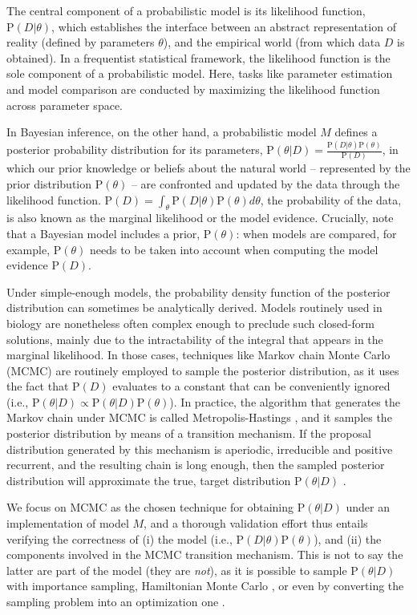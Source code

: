 \documentclass[oneside]{article}
\begin{document}
The central component of a probabilistic model is its likelihood
function, $\text{P}(D|\theta)$, which establishes the
interface between an abstract representation of reality (defined by parameters $\theta$), and the
empirical world (from which data $D$ is obtained).
In a frequentist statistical framework, the likelihood function is the sole
component of a probabilistic model.
Here, tasks like parameter estimation and model comparison are conducted
by maximizing the likelihood function across parameter
space.

In Bayesian inference, on the other hand, a probabilistic model $M$
defines a posterior probability distribution for its parameters,
$\text{P}(\theta|D) = \frac{\text{P}(D|\theta)\text{P}(\theta)}{\text{P}(D)}$, in which our prior
knowledge or beliefs about the natural world -- represented by the prior
distribution $\text{P}(\theta)$ -- are confronted and updated by the data through the
likelihood function.
$\text{P}(D) = \int_\theta \text{P}(D|\theta)\text{P}(\theta)d\theta$, the probability of
the data, is also known as the marginal likelihood or the model
evidence.
Crucially, note that a Bayesian model includes a prior, $\text{P}(\theta)$:
when models are compared, for example, $\text{P}(\theta)$ needs to be taken
into account when computing the model evidence $\text{P}(D)$.

Under simple-enough models, the probability density function of the posterior distribution can sometimes be analytically
derived.
Models routinely used in biology are nonetheless often complex enough
to preclude such closed-form solutions, mainly due to the
intractability of the integral that appears in the marginal
likelihood.
In those cases, techniques like Markov chain Monte Carlo (MCMC) are
routinely employed to sample the posterior distribution, as it uses
the fact that $\text{P}(D)$ evaluates to a constant that can be
conveniently ignored (i.e., $\text{P}(\theta|D) \propto
\text{P}(\theta|D)\text{P}(\theta)$).
In practice, the algorithm that generates the Markov chain under MCMC is called
Metropolis-Hastings \citep{mh}, and it samples the posterior distribution by
means of a transition mechanism. 
If the proposal distribution generated by this mechanism is aperiodic, irreducible and
positive recurrent, and the resulting chain is long enough, then the
sampled posterior distribution will approximate the true, target
distribution $\text{P}(\theta|D)$ \citep{smith93,tierney94,gelman}.

We focus on MCMC as the chosen technique for obtaining $\text{P}(\theta|D)$
under an implementation of model $M$,
and a thorough validation effort thus entails verifying the
correctness of (i) the model (i.e., $\text{P}(D|\theta)\text{P}(\theta)$), and (ii)
the components involved in the MCMC transition mechanism.
This is not to say the latter are part of the model (they are
\emph{not}), as it is possible to sample $\text{P}(\theta|D)$ with importance sampling, Hamiltonian
Monte Carlo \citep{hmc}, or even by converting the sampling problem into an
optimization one \citep{zhang18}.
\end{document}
